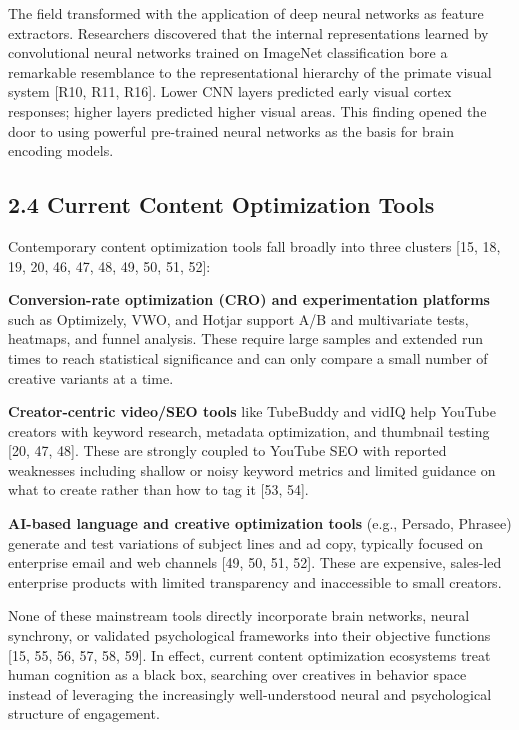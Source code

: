 \documentclass[11pt,letterpaper]{article}
\begin{document}
The field transformed with the application of deep neural networks as feature extractors. Researchers discovered that the internal representations learned by convolutional neural networks trained on ImageNet classification bore a remarkable resemblance to the representational hierarchy of the primate visual system [R10, R11, R16]. Lower CNN layers predicted early visual cortex responses; higher layers predicted higher visual areas. This finding opened the door to using powerful pre-trained neural networks as the basis for brain encoding models.

\subsection{2.4 Current Content Optimization Tools}

Contemporary content optimization tools fall broadly into three clusters [15, 18, 19, 20, 46, 47, 48, 49, 50, 51, 52]:

\textbf{Conversion-rate optimization (CRO) and experimentation platforms} such as Optimizely, VWO, and Hotjar support A/B and multivariate tests, heatmaps, and funnel analysis. These require large samples and extended run times to reach statistical significance and can only compare a small number of creative variants at a time.

\textbf{Creator-centric video/SEO tools} like TubeBuddy and vidIQ help YouTube creators with keyword research, metadata optimization, and thumbnail testing [20, 47, 48]. These are strongly coupled to YouTube SEO with reported weaknesses including shallow or noisy keyword metrics and limited guidance on what to create rather than how to tag it [53, 54].

\textbf{AI-based language and creative optimization tools} (e.g., Persado, Phrasee) generate and test variations of subject lines and ad copy, typically focused on enterprise email and web channels [49, 50, 51, 52]. These are expensive, sales-led enterprise products with limited transparency and inaccessible to small creators.

None of these mainstream tools directly incorporate brain networks, neural synchrony, or validated psychological frameworks into their objective functions [15, 55, 56, 57, 58, 59]. In effect, current content optimization ecosystems treat human cognition as a black box, searching over creatives in behavior space instead of leveraging the increasingly well-understood neural and psychological structure of engagement.
\end{document}
